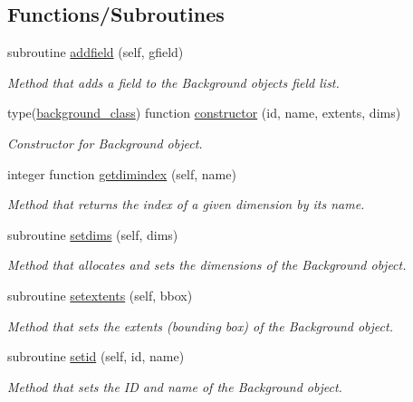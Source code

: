 \subsection*{Functions/\+Subroutines}
\begin{DoxyCompactItemize}
\item 
subroutine \mbox{\hyperlink{namespacebackground__mod_aa6ddc308698724f00ce1177ded5afc4c}{addfield}} (self, gfield)
\begin{DoxyCompactList}\small\item\em Method that adds a field to the Background object\textquotesingle{}s field list. \end{DoxyCompactList}\item 
type(\mbox{\hyperlink{structbackground__mod_1_1background__class}{background\+\_\+class}}) function \mbox{\hyperlink{namespacebackground__mod_ad0096fb6a5a11854fd70a7ce58dc3000}{constructor}} (id, name, extents, dims)
\begin{DoxyCompactList}\small\item\em Constructor for Background object. \end{DoxyCompactList}\item 
integer function \mbox{\hyperlink{namespacebackground__mod_a4e05d8be917e0143fe5889f2b19b750d}{getdimindex}} (self, name)
\begin{DoxyCompactList}\small\item\em Method that returns the index of a given dimension by it\textquotesingle{}s name. \end{DoxyCompactList}\item 
subroutine \mbox{\hyperlink{namespacebackground__mod_a06d96d4627391d74feb105a842a87dc0}{setdims}} (self, dims)
\begin{DoxyCompactList}\small\item\em Method that allocates and sets the dimensions of the Background object. \end{DoxyCompactList}\item 
subroutine \mbox{\hyperlink{namespacebackground__mod_ae8871564866fdd657a25f6a5a2256c33}{setextents}} (self, bbox)
\begin{DoxyCompactList}\small\item\em Method that sets the extents (bounding box) of the Background object. \end{DoxyCompactList}\item 
subroutine \mbox{\hyperlink{namespacebackground__mod_a4feaccf688558d8590ece4f09c65c977}{setid}} (self, id, name)
\begin{DoxyCompactList}\small\item\em Method that sets the ID and name of the Background object. \end{DoxyCompactList}\item 

\end{DoxyCompactItemize}
